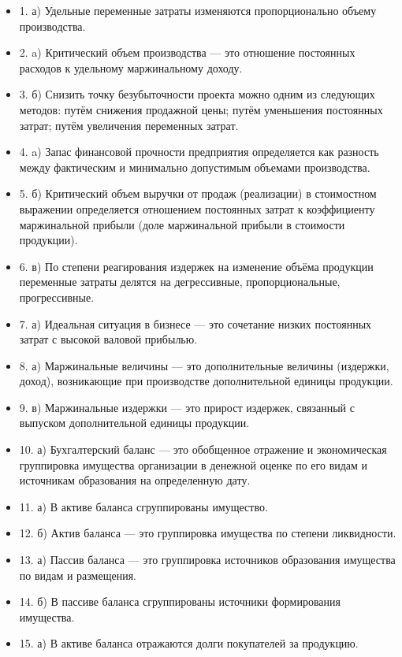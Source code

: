 \documentclass[14pt,a4paper]{extarticle}
\begin{document}
\begin{itemize}
    \item 1. а) Удельные переменные затраты изменяются пропорционально объему производства.
    \item 2. a) Критический объем производства — это отношение постоянных расходов к удельному маржинальному доходу.
    \item 3. б) Снизить точку безубыточности проекта можно одним из следующих методов: путём снижения продажной цены; путём уменьшения постоянных затрат; путём увеличения переменных затрат.
    \item 4. a) Запас финансовой прочности предприятия определяется как разность между фактическим и минимально допустимым объемами производства.
    \item 5. б) Критический объем выручки от продаж (реализации) в стоимостном выражении определяется отношением постоянных затрат к коэффициенту маржинальной прибыли (доле маржинальной прибыли в стоимости продукции).
    \item 6. в) По степени реагирования издержек на изменение объёма продукции переменные затраты делятся на дегрессивные, пропорциональные, прогрессивные.
    \item 7. а) Идеальная ситуация в бизнесе — это сочетание низких постоянных затрат с высокой валовой прибылью.
    \item 8. а) Маржинальные величины — это дополнительные величины (издержки, доход), возникающие при производстве дополнительной единицы продукции.
    \item 9. в) Маржинальные издержки — это прирост издержек, связанный с выпуском дополнительной единицы продукции.
    \item 10. а) Бухгалтерский баланс — это обобщенное отражение и экономическая группировка имущества организации в денежной оценке по его видам и источникам образования на определенную дату.
    \item 11. а) В активе баланса сгруппированы имущество.
    \item 12. б) Актив баланса — это группировка имущества по степени ликвидности.
    \item 13. а) Пассив баланса — это группировка источников образования имущества по видам и размещения.
    \item 14. б) В пассиве баланса сгруппированы источники формирования имущества.
    \item 15. а) В активе баланса отражаются долги покупателей за продукцию.
\end{itemize}
\end{document}
